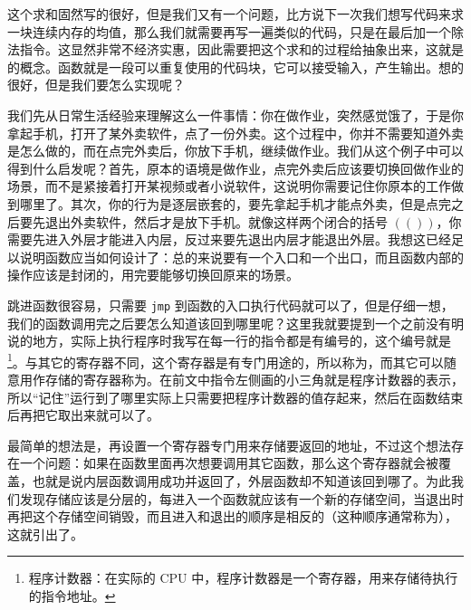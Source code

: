 这个求和固然写的很好，但是我们又有一个问题，比方说下一次我们想写代码来求一块连续内存的均值，那么我们就需要再写一遍类似的代码，只是在最后加一个除法指令。这显然非常不经济实惠，因此需要把这个求和的过程给抽象出来，这就是的概念。函数就是一段可以重复使用的代码块，它可以接受输入，产生输出。想的很好，但是我们要怎么实现呢？

我们先从日常生活经验来理解这么一件事情：你在做作业，突然感觉饿了，于是你拿起手机，打开了某外卖软件，点了一份外卖。这个过程中，你并不需要知道外卖是怎么做的，而在点完外卖后，你放下手机，继续做作业。我们从这个例子中可以得到什么启发呢？首先，原本的语境是做作业，点完外卖后应该要切换回做作业的场景，而不是紧接着打开某视频或者小说软件，这说明你需要记住你原本的工作做到哪里了。其次，你的行为是逐层嵌套的，要先拿起手机才能点外卖，但是点完之后要先退出外卖软件，然后才是放下手机。就像这样两个闭合的括号 $(())$，你需要先进入外层才能进入内层，反过来要先退出内层才能退出外层。我想这已经足以说明函数应当如何设计了：总的来说要有一个入口和一个出口，而且函数内部的操作应该是封闭的，用完要能够切换回原来的场景。

跳进函数很容易，只需要 \texttt{jmp} 到函数的入口执行代码就可以了，但是仔细一想，我们的函数调用完之后要怎么知道该回到哪里呢？这里我就要提到一个之前没有明说的地方，实际上执行程序时我写在每一行的指令都是有编号的，这个编号就是\footnote{程序计数器：在实际的 CPU 中，程序计数器是一个寄存器，用来存储待执行的指令地址。}。与其它的寄存器不同，这个寄存器是有专门用途的，所以称为，而其它可以随意用作存储的寄存器称为。在前文中指令左侧画的小三角就是程序计数器的表示，所以“记住”运行到了哪里实际上只需要把程序计数器的值存起来，然后在函数结束后再把它取出来就可以了。

最简单的想法是，再设置一个寄存器专门用来存储要返回的地址，不过这个想法存在一个问题：如果在函数里面再次想要调用其它函数，那么这个寄存器就会被覆盖，也就是说内层函数调用成功并返回了，外层函数却不知道该回到哪了。为此我们发现存储应该是分层的，每进入一个函数就应该有一个新的存储空间，当退出时再把这个存储空间销毁，而且进入和退出的顺序是相反的（这种顺序通常称为），这就引出了。

